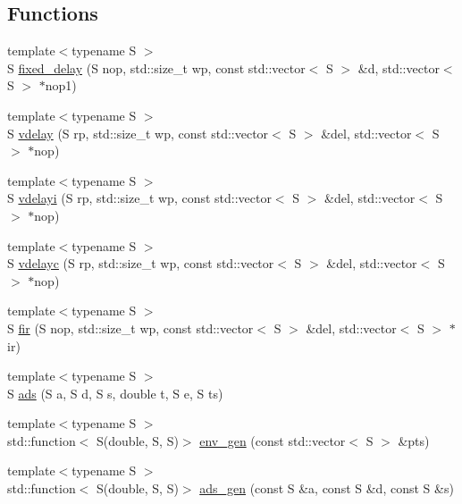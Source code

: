 \subsection*{Functions}
\begin{DoxyCompactItemize}
\item 
{\footnotesize template$<$typename S $>$ }\\S \hyperlink{namespace_aurora_afe9bb9ea0f50912f1fc95a2b15b135dd}{fixed\+\_\+delay} (S nop, std\+::size\+\_\+t wp, const std\+::vector$<$ S $>$ \&d, std\+::vector$<$ S $>$ $\ast$nop1)
\item 
{\footnotesize template$<$typename S $>$ }\\S \hyperlink{namespace_aurora_a384371636fb98d2845ddc7619acefd0b}{vdelay} (S rp, std\+::size\+\_\+t wp, const std\+::vector$<$ S $>$ \&del, std\+::vector$<$ S $>$ $\ast$nop)
\item 
{\footnotesize template$<$typename S $>$ }\\S \hyperlink{namespace_aurora_a6882049233d07537b7f0bdff7d703306}{vdelayi} (S rp, std\+::size\+\_\+t wp, const std\+::vector$<$ S $>$ \&del, std\+::vector$<$ S $>$ $\ast$nop)
\item 
{\footnotesize template$<$typename S $>$ }\\S \hyperlink{namespace_aurora_ae0b6df856278006b4fed4641f8ffe051}{vdelayc} (S rp, std\+::size\+\_\+t wp, const std\+::vector$<$ S $>$ \&del, std\+::vector$<$ S $>$ $\ast$nop)
\item 
{\footnotesize template$<$typename S $>$ }\\S \hyperlink{namespace_aurora_a9b89513b24d0d89f0ecd400c899c78ce}{fir} (S nop, std\+::size\+\_\+t wp, const std\+::vector$<$ S $>$ \&del, std\+::vector$<$ S $>$ $\ast$ir)
\item 
{\footnotesize template$<$typename S $>$ }\\S \hyperlink{namespace_aurora_a787aaa0540c8f3be97e0ad55ba643b0a}{ads} (S a, S d, S s, double t, S e, S ts)
\item 
{\footnotesize template$<$typename S $>$ }\\std\+::function$<$ S(double, S, S)$>$ \hyperlink{namespace_aurora_aeac34405f4d58ec77eb9519844518255}{env\+\_\+gen} (const std\+::vector$<$ S $>$ \&pts)
\item 
{\footnotesize template$<$typename S $>$ }\\std\+::function$<$ S(double, S, S)$>$ \hyperlink{namespace_aurora_ac7d13365b103aa497998c2bb23ad7f13}{ads\+\_\+gen} (const S \&a, const S \&d, const S \&s)
\item 

\end{DoxyCompactItemize}
